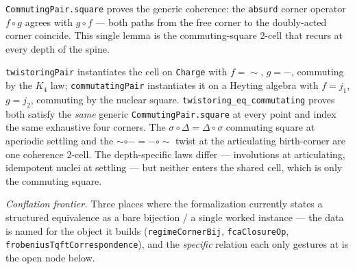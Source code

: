 \begin{theorem}\label{thm:commuting-square}\leanok{}
\texttt{CommutingPair.square} proves the generic coherence: the \texttt{absurd} corner operator $f \circ g$ agrees with $g \circ f$ --- both paths from the free corner to the doubly-acted corner coincide. This single lemma is the commuting-square 2-cell that recurs at every depth of the spine.
\end{theorem}
\begin{theorem}\label{thm:twistoring-eq-commutating}\leanok{}
\texttt{twistoringPair} instantiates the cell on \texttt{Charge} with $f = {\sim}$, $g = {-}$, commuting by the $K_4$ law; \texttt{commutatingPair} instantiates it on a Heyting algebra with $f = j_1$, $g = j_2$, commuting by the nuclear square. \texttt{twistoring\_eq\_commutating} proves both satisfy the \emph{same} generic \texttt{CommutingPair.square} at every point and index the same exhaustive four corners. The $\sigma\circ\Delta = \Delta\circ\sigma$ commuting square at aperiodic settling and the ${\sim}\circ{-} = {-}\circ{\sim}$ twist at the articulating birth-corner are one coherence 2-cell. The depth-specific laws differ --- involutions at articulating, idempotent nuclei at settling --- but neither enters the shared cell, which is only the commuting square.
\end{theorem}

\noindent\emph{Conflation frontier.} Three places where the formalization currently states a structured equivalence as a bare bijection / a single worked instance --- the data is named for the object it builds (\texttt{regimeCornerBij}, \texttt{fcaClosureOp}, \texttt{frobeniusTqftCorrespondence}), and the \emph{specific} relation each only gestures at is the open node below.

